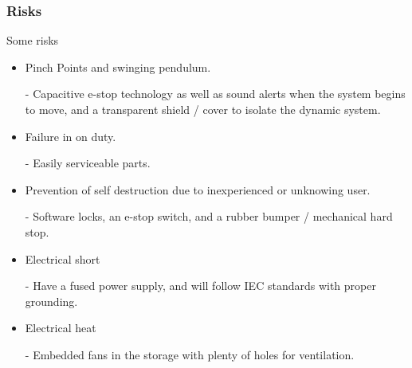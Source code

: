 \documentclass[aspectratio=169]{beamer}
\begin{document}
\begin{frame}
    \frametitle{Risks}

    Some risks

    \begin{itemize}
        \item Pinch Points and swinging pendulum.
        \item [-] Capacitive e-stop technology as well as sound alerts when the system begins to move, and a transparent shield / cover to isolate the dynamic system.
        \item Failure in on duty.
        \item [-] Easily serviceable parts.
        \item Prevention of self destruction due to inexperienced or unknowing user.
        \item [-] Software locks, an e-stop switch, and a rubber bumper / mechanical hard stop.
        \item Electrical short
        \item [-] Have a fused power supply, and will follow IEC standards with proper grounding.
        \item Electrical heat
        \item [-] Embedded fans in the storage with plenty of holes for ventilation.
    \end{itemize}

\end{frame}
\end{document}
